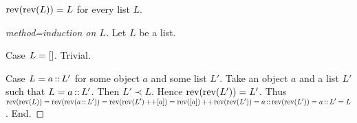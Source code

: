 \documentclass[10pt]{article}
\begin{document}
  \begin{forthel}
    \begin{proposition}[id=LISTS_REV_1021563255448756,printid]
      $\textrm{rev}(\textrm{rev}(L)) = L$ for every list $L$.
    \end{proposition}
    \begin{proof}[method=induction on $L$]
      Let $L$ be a list.

      Case $L = []$. Trivial.
    
      Case $L = a \mathop{::} L'$ for some object $a$ and some list $L'$.
        Take an object $a$ and a list $L'$ such that $L = a \mathop{::} L'$.
        Then $L' \prec L$.
        Hence $\textrm{rev}(\textrm{rev}(L')) = L'$.
        Thus $\textrm{rev}(\textrm{rev}(L))
          = \textrm{rev}(\textrm{rev}(a \mathop{::} L'))
          = \textrm{rev}(\textrm{rev}(L') \mathop{++} [a])
          = \textrm{rev}([a]) \mathop{++} \textrm{rev}(\textrm{rev}(L'))
          = a \mathop{::} \textrm{rev}(\textrm{rev}(L'))
          = a \mathop{::} L'
          = L$.
      End.
    \end{proof}
  \end{forthel}
\end{document}
